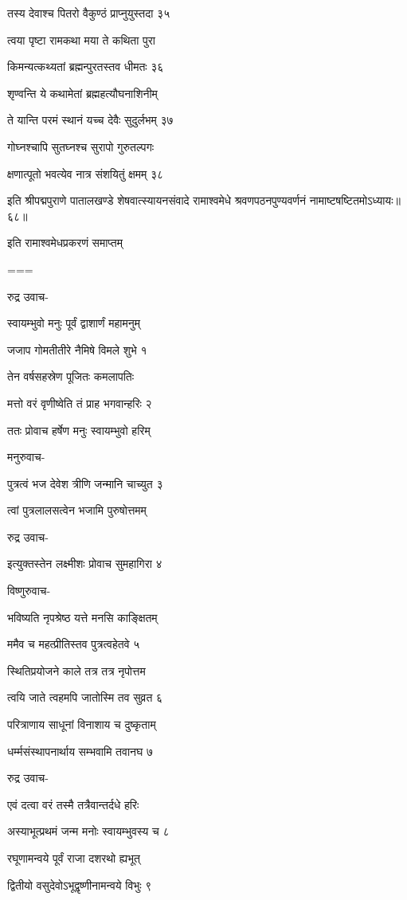 तस्य देवाश्च पितरो वैकुण्ठं प्राप्नुयुस्तदा ३५

त्वया पृष्टा रामकथा मया ते कथिता पुरा

किमन्यत्कथ्यतां ब्रह्मन्पुरतस्तव धीमतः ३६

शृण्वन्ति ये कथामेतां ब्रह्महत्यौघनाशिनीम्

ते यान्ति परमं स्थानं यच्च देवैः सुदुर्लभम् ३७

गोघ्नश्चापि सुतघ्नश्च सुरापो गुरुतल्पगः

क्षणात्पूतो भवत्येव नात्र संशयितुं क्षमम् ३८

इति श्रीपद्मपुराणे पातालखण्डे शेषवात्स्यायनसंवादे रामाश्वमेधे श्रवणपठनपुण्यवर्णनं नामाष्टषष्टितमोऽध्यायः॥६८॥

इति रामाश्वमेधप्रकरणं समाप्तम्

===


रुद्र उवाच-

स्वायम्भुवो मनुः पूर्वं द्वाशार्णं महामनुम्

जजाप गोमतीतीरे नैमिषे विमले शुभे १

तेन वर्षसहस्रेण पूजितः कमलापतिः

मत्तो वरं वृणीष्वेति तं प्राह भगवान्हरिः २

ततः प्रोवाच हर्षेण मनुः स्वायम्भुवो हरिम्

मनुरुवाच-

पुत्रत्वं भज देवेश त्रीणि जन्मानि चाच्युत ३

त्वां पुत्रलालसत्वेन भजामि पुरुषोत्तमम्

रुद्र उवाच-

इत्युक्तस्तेन लक्ष्मीशः प्रोवाच सुमहागिरा ४

विष्णुरुवाच-

भविष्यति नृपश्रेष्ठ यत्ते मनसि काङ्क्षितम्

ममैव च महत्प्रीतिस्तव पुत्रत्वहेतवे ५

स्थितिप्रयोजने काले तत्र तत्र नृपोत्तम

त्वयि जाते त्वहमपि जातोस्मि तव सुव्रत ६

परित्राणाय साधूनां विनाशाय च दुष्कृताम्

धर्म्मसंस्थापनार्थाय सम्भवामि तवानघ ७

रुद्र उवाच-

एवं दत्वा वरं तस्मै तत्रैवान्तर्दधे हरिः

अस्याभूत्प्रथमं जन्म मनोः स्वायम्भुवस्य च ८

रघूणामन्वये पूर्वं राजा दशरथो ह्यभूत्

द्वितीयो वसुदेवोऽभूद्वृष्णीनामन्वये विभुः ९

